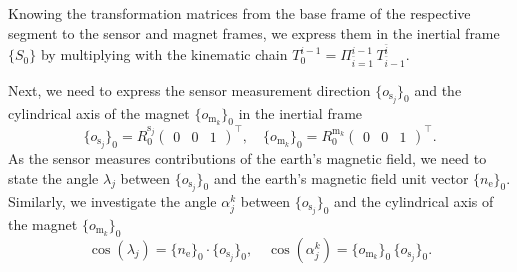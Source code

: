 Knowing the transformation matrices from the base frame of the respective segment to the sensor and magnet frames, we express them in the inertial frame $\{S_{0}\}$ by multiplying with the kinematic chain $T_{0}^{i-1} = \Pi_{\bar{i}=1}^{i-1} \, T_{\bar{i}-1}^{\bar{i}}$.

Next, we need to express the sensor measurement direction $\{ o_{\mathrm{s}_j} \}_{0}$ and the cylindrical axis of the magnet $\{ o_{\mathrm{m}_k} \}_{0}$ in the inertial frame
\begin{equation}
    \{ o_{\mathrm{s}_j} \}_{0} = R_{0}^{\mathrm{s}_j}
    \begin{pmatrix}
        0 & 0 & 1
    \end{pmatrix}^{\top},
    \quad
    \{ o_{\mathrm{m}_k} \}_{0} = R_{0}^{\mathrm{m}_k}
    \begin{pmatrix}
        0 & 0 & 1
    \end{pmatrix}^{\top}.
\end{equation}
%
As the sensor measures contributions of the earth's magnetic field, we need to state the angle $\lambda_{j}$ between $\{ o_{\mathrm{s}_j} \}_0$ and the earth's magnetic field unit vector $\{ n_{\mathrm{e}} \}_{0}$. 
Similarly, we investigate the angle $\alpha_j^k$ between $\{ o_{\mathrm{s}_j} \}_{0}$ and the cylindrical axis of the magnet $\{ o_{\mathrm{m}_k} \}_{0}$
\begin{equation}
    \cos (\lambda_{j}) = \{n_{\mathrm{e}} \}_{0} \cdot \{ o_{\mathrm{s}_j} \}_{0},
    \quad
    \cos (\alpha_{j}^k) = \{ o_{\mathrm{m}_k} \}_{0} \, \{ o_{\mathrm{s}_j} \}_{0}.
\end{equation}
